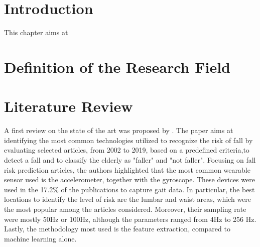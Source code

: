 \section{Introduction}
This chapter aims at 
\section{Definition of the Research Field}
\section{Literature Review}
A first review on the state of the art was proposed by \cite{FallRiskAssessment_WearableSensors_SystematicReview}. The paper aims at identifying the most common technologies utilized to recognize the risk of fall by evaluating selected articles, from 2002 to 2019, based on a predefined criteria,to detect a fall and to classify the elderly as "faller" and "not faller".  
Focusing on fall risk prediction articles, the authors highlighted that the most common wearable sensor used is the accelerometer, together with the gyroscope. These devices were used in the 17.2\% of the publications to capture gait data. In particular, the best locations to identify the level of risk are the lumbar and waist areas, which were the most popular among the articles considered. Moreover, their sampling rate were mostly 50Hz or 100Hz, although the parameters ranged from 4Hz to 256 Hz. 
Lastly, the methodology most used is the feature extraction, compared to machine learning alone. \\

